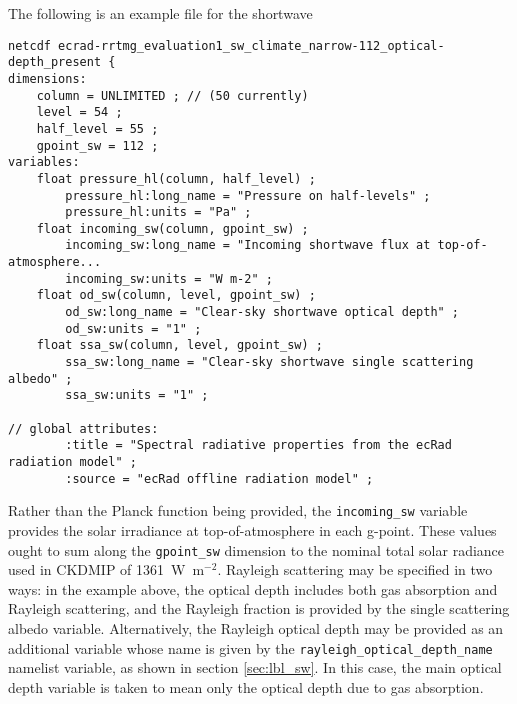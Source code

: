 \documentclass[twoside]{article}
\def\codesize{\small}
\def\code#1{{\codesize\texttt{#1}}}
\begin{document}
The following is an example file for the shortwave
%
\begin{verbatim}
netcdf ecrad-rrtmg_evaluation1_sw_climate_narrow-112_optical-depth_present {
dimensions:
    column = UNLIMITED ; // (50 currently)
    level = 54 ;
    half_level = 55 ;
    gpoint_sw = 112 ;
variables:
    float pressure_hl(column, half_level) ;
        pressure_hl:long_name = "Pressure on half-levels" ;
        pressure_hl:units = "Pa" ;
    float incoming_sw(column, gpoint_sw) ;
        incoming_sw:long_name = "Incoming shortwave flux at top-of-atmosphere...
        incoming_sw:units = "W m-2" ;
    float od_sw(column, level, gpoint_sw) ;
        od_sw:long_name = "Clear-sky shortwave optical depth" ;
        od_sw:units = "1" ;
    float ssa_sw(column, level, gpoint_sw) ;
        ssa_sw:long_name = "Clear-sky shortwave single scattering albedo" ;
        ssa_sw:units = "1" ;

// global attributes:
        :title = "Spectral radiative properties from the ecRad radiation model" ;
        :source = "ecRad offline radiation model" ;
\end{verbatim}
%
Rather than the Planck function being provided, the
\code{incoming\_sw} variable provides the solar irradiance at
top-of-atmosphere in each g-point.  These values ought to sum along
the \code{gpoint\_sw} dimension to the nominal total solar radiance
used in CKDMIP of 1361~W~m$^{-2}$.  Rayleigh scattering may be
specified in two ways: in the example above, the optical depth
includes both gas absorption and Rayleigh scattering, and the Rayleigh
fraction is provided by the single scattering albedo
variable. Alternatively, the Rayleigh optical depth may be provided as
an additional variable whose name is given by the
\code{rayleigh\_optical\_depth\_name} namelist variable, as shown in
section \ref{sec:lbl_sw}. In this case, the main optical depth
variable is taken to mean only the optical depth due to gas
absorption.
\end{document}
